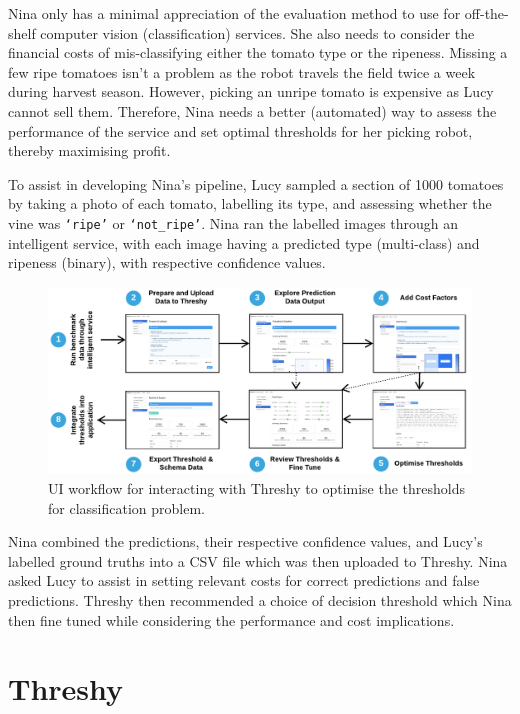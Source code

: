 Nina only has a minimal appreciation of the evaluation method to use for off-the-shelf computer vision (classification) services. She also needs to consider the financial costs of mis-classifying either the tomato type or the ripeness. Missing a few ripe tomatoes isn't a problem as the robot travels the field twice a week during harvest season. However, picking an unripe tomato is expensive as Lucy cannot sell them. Therefore, Nina needs a better (automated) way to assess the performance of the service and set optimal thresholds for her picking robot, thereby maximising profit.

To assist in developing Nina's pipeline, Lucy sampled a section of 1000 tomatoes by taking a photo of each tomato, labelling its type, and assessing whether the vine was  \texttt{`ripe'} or \texttt{`not\_ripe'}. Nina ran the labelled images through an intelligent service, with each image having a predicted type (multi-class) and ripeness (binary), with respective confidence values. 

\begin{figure}[t!]
    \centering
    \includegraphics[width=\linewidth]{workflow}
    \caption[UI workflow of Threshy]{UI workflow for interacting with Threshy to optimise the thresholds for classification problem.}
    \label{icse-demo2020:fig:workflow}
\end{figure}

Nina combined the predictions, their respective confidence values, and Lucy's labelled ground truths into a CSV file which was then uploaded to Threshy. Nina asked Lucy to assist in setting relevant costs for correct predictions and false predictions. Threshy then recommended a choice of decision threshold which Nina then fine tuned while considering the performance and cost implications. 

\section{Threshy}
\label{icse-demo2020:sec:threshy}

